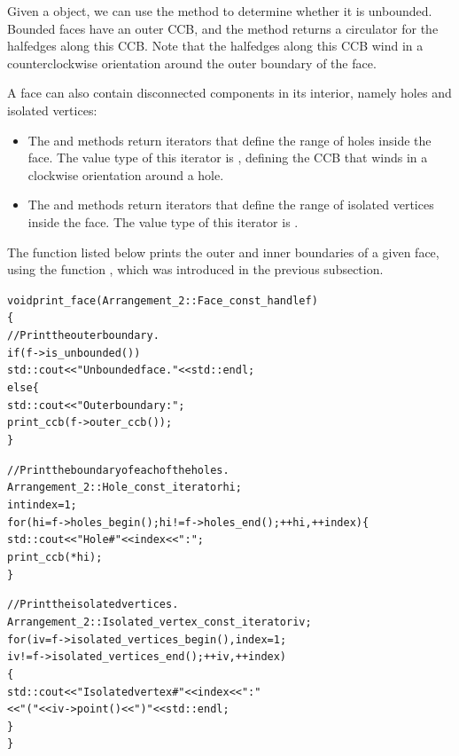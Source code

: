 Given a  object, we can use the 
method to determine whether it is unbounded. Bounded faces have an
outer CCB, and the  method returns a circulator
for the halfedges along this CCB. Note that the halfedges along
this CCB wind in a counterclockwise orientation around the outer
boundary of the face.

A face can also contain disconnected components in its interior,
namely holes and isolated vertices:
\begin{itemize}
\item The  and  methods return
 iterators that define the range
of holes inside the face. The value type of this iterator is
, defining the CCB that winds in a
clockwise orientation around a hole.
\item The  and
 methods return
 iterators that
define the range of isolated vertices inside the face. The value
type of this iterator is .
\end{itemize}

The function  listed below prints the outer and
inner boundaries of a given face, using the function ,
which was introduced in the previous subsection.
\begin{alltt}
void print_face (Arrangement_2::Face_const_handle f)
\{
  // Print the outer boundary.
  if (f->is_unbounded())
    std::cout << "Unbounded face. " << std::endl;
  else \{
    std::cout << "Outer boundary: ";
    print_ccb (f->outer_ccb());
  \}

  // Print the boundary of each of the holes.
  Arrangement_2::Hole_const_iterator hi;
  int                                 index = 1;
  for (hi = f->holes_begin(); hi != f->holes_end(); ++hi, ++index) \{
    std::cout << "    Hole #" << index << ": ";
    print_ccb (*hi);
  \}

  // Print the isolated vertices.
  Arrangement_2::Isolated_vertex_const_iterator iv;
  for (iv = f->isolated_vertices_begin(), index = 1;
       iv != f->isolated_vertices_end(); ++iv, ++index)
  \{
    std::cout << "    Isolated vertex #" << index << ": "
              << "(" << iv->point() << ")" << std::endl;
  \}
\}
\end{alltt}

